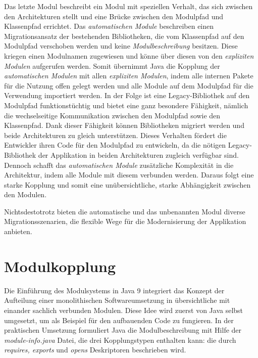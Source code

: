     Das letzte Modul beschreibt ein Modul mit speziellen Verhalt, das sich zwischen den Architekturen stellt und eine Brücke zwischen den Modulpfad und Klassenpfad errichtet. Das \textit{automatischen Module} beschreiben einen Migrationsansatz der bestehenden Bibliotheken, die vom Klassenpfad auf den Modulpfad verschoben werden und keine \textit{Modulbeschreibung} besitzen. Diese kriegen einen Modulnamen zugewiesen und könne über diesen von den \textit{expliziten Modulen} aufgerufen werden. Somit übernimmt Java die Kopplung der \textit{automatischen Modulen} mit allen \textit{expliziten Modulen}, indem alle internen Pakete für die Nutzung offen gelegt werden und alle Module auf dem Modulpfad für die Verwendung importiert werden. In der Folge ist eine Legacy-Bibliothek auf den Modulpfad funktionstüchtig und bietet eine ganz besondere Fähigkeit, nämlich die wechselseitige Kommunikation zwischen den Modulpfad sowie den Klassenpfad. Dank dieser Fähigkeit können Bibliotheken migriert werden und beide Architekturen zu gleich unterstützen. Dieses Verhalten fördert die Entwickler ihren Code für den Modulpfad zu entwickeln, da die nötigen Legacy-Bibliothek der Applikation in beiden Architekturen zugleich verfügbar sind. Dennoch schafft das \textit{automatischen Module} zusätzliche Komplexität in die Architektur, indem alle Module mit diesem verbunden werden. Daraus folgt eine starke Kopplung und somit eine unübersichtliche, starke Abhängigkeit zwischen den Modulen.\cite{modulMitJava9,java9modRevealed,modulProgJava9}\bigbreak

    Nichtsdestotrotz bieten die automatische und das unbenannten Modul diverse Migrationsszenarien, die flexible Wege für die Modernisierung der Applikation anbieten. 

  \section{Modulkopplung} \label{sec:mod_kop}
    Die Einführung des Modulsystems in Java 9 integriert das Konzept der Aufteilung einer monolithischen Softwareumsetzung in übersichtliche mit einander sachlich verbunden Modulen. Diese Idee wird zuerst von Java selbst umgesetzt, um als Beispiel für den aufbauenden Code zu fungieren. In der praktischen Umsetzung formuliert Java die Modulbeschreibung mit Hilfe der \textit{module-info.java} Datei, die drei Kopplungstypen enthalten kann: die durch \textit{requires, exports} und \textit{opens} Deskriptoren beschrieben wird.

